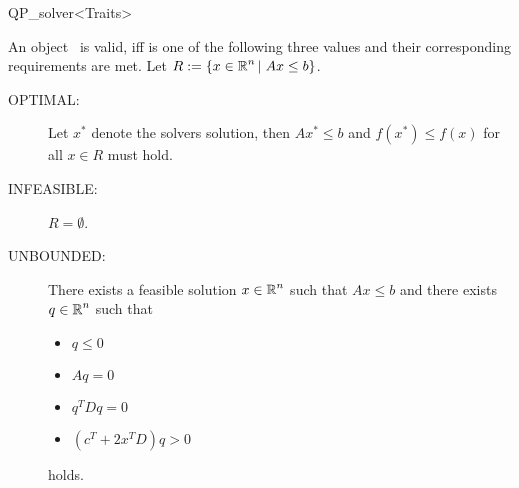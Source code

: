 \begin{ccRefClass}{QP_solver<Traits>}
\begin{ccIndexMemberFunctions}
An object \ccVar\ is valid, iff  is one of the following
three values and their corresponding requirements are met. Let
$R:=\{x \in \mbox{$\mathbb R$}^{n}\left|\right. Ax \leq b\}$.
\begin{description}
\item[OPTIMAL:] Let $x^{*}$ denote the solvers solution, then 
$Ax^{*} \leq b$ and $f(x^{*}) \leq f(x)$ for all $x \in R$ must hold.
\item[INFEASIBLE:] $R = \emptyset$.
\item[UNBOUNDED:] There exists a feasible solution $x \in \mbox{$\mathbb R$}^{n}$ such that
$Ax \leq b$ and there exists $q \in \mbox{$\mathbb R$}^{n}$ such that
  \begin{itemize}
    \item $q \leq 0$
    \item $Aq = 0$
    \item $q^{T}Dq=0$
    \item $(c^{T} + 2x^{T}D)q > 0$
  \end{itemize}
holds.
\end{description}




\end{ccIndexMemberFunctions}


\ccSeeAlso
%
    \\
    \\
    \\
    \\

\ccImplementation
\ccIndexImplementation


\ccExample
{}

\end{ccRefClass}


